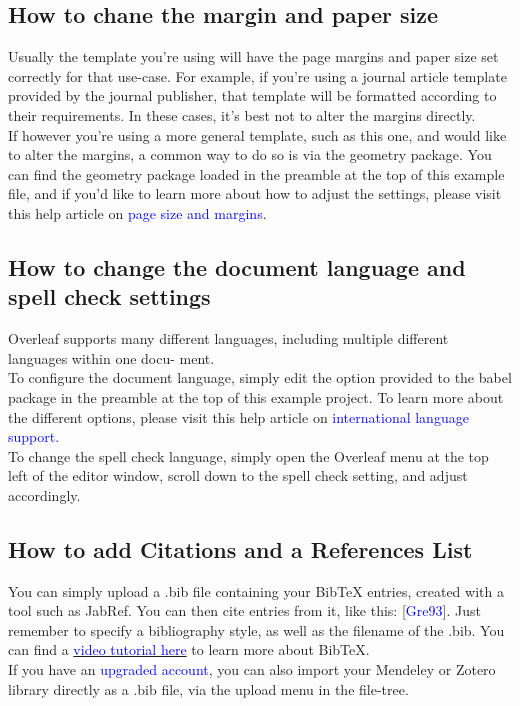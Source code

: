 \documentclass{article}
\begin{document}

\subsection{How to chane the margin and paper size}

Usually the template you’re using will have the page margins and paper size set correctly for that
use-case. For example, if you’re using a journal article template provided by the journal publisher,
that template will be formatted according to their requirements. In these cases, it’s best not to alter
the margins directly.\\

If however you’re using a more general template, such as this one, and would like to alter the
margins, a common way to do so is via the geometry package. You can find the geometry package
loaded in the preamble at the top of this example file, and if you’d like to learn more about how to
adjust the settings, please visit this help article on \textcolor{blue}{page size and margins}.

\subsection{How to change the document language and spell check settings}
Overleaf supports many different languages, including multiple different languages within one docu-
ment.\\
To configure the document language, simply edit the option provided to the babel package in the
preamble at the top of this example project. To learn more about the different options, please visit
this help article on \textcolor{blue}{international language support}.\\

To change the spell check language, simply open the Overleaf menu at the top left of the editor
window, scroll down to the spell check setting, and adjust accordingly.

\subsection{How to add Citations and a References List}
You can simply upload a .bib file containing your BibTeX entries, created with a tool such as JabRef.
You can then cite entries from it, like this: [\textcolor{blue}{Gre93}]. Just remember to specify a bibliography style, as
well as the filename of the .bib. You can find a \href{https://www.overleaf.com/learn/latex/Questions/How_to_include_a_bibliography_using_bibtex}{\textcolor{blue}{video tutorial here}} to learn more about BibTeX.\\
If you have an \textcolor{blue}{upgraded account}, you can also import your Mendeley or Zotero library directly as
a .bib file, via the upload menu in the file-tree.
\end{document}
